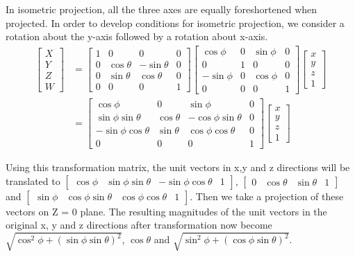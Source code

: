 \documentclass[12pt]{article}
\begin{document}
In isometric projection, all the three axes are equally foreshortened when projected. In order to develop conditions for isometric projection, we consider a rotation about the y-axis followed by a rotation about x-axis.
\begin{align}
    \begin{bmatrix}
    	X \\ Y \\ Z \\ W
    \end{bmatrix} & =  
    \begin{bmatrix}
    	1 & 0 & 0 & 0 \\
    	0 & \cos \theta & -\sin \theta & 0 \\
    	0 & \sin \theta & \cos \theta & 0 \\
    	0 & 0 & 0 & 1  
    \end{bmatrix} 
    \begin{bmatrix}
    	\cos \phi & 0 & \sin \phi & 0 \\
    	0 & 1 & 0 & 0 \\
    	-\sin \phi & 0 & \cos \phi & 0 \\
    	0 & 0 & 0 & 1  
    \end{bmatrix}
    \begin{bmatrix}
    	x \\ y \\ z \\ 1
    \end{bmatrix}\\
    & = 
    \begin{bmatrix}
    	\cos \phi & 0 & \sin \phi & 0 \\
    	\sin \phi \sin \theta & \cos \theta & -\cos \phi \sin \theta & 0 \\
    	-\sin \phi \cos \theta & \sin \theta & \cos \phi \cos \theta & 0 \\
    	0 & 0 & 0 & 1 
    \end{bmatrix}
    \begin{bmatrix}
    	x \\ y \\ z \\ 1
    \end{bmatrix}
\end{align}

Using this transformation matrix, the unit vectors in x,y and z directions will be translated to $\begin{bmatrix}
\cos \phi & \sin \phi \sin \theta & -\sin \phi \cos \theta & 1
\end{bmatrix}
$, 
$\begin{bmatrix}
	0 & \cos \theta & \sin \theta & 1
\end{bmatrix}$ and 
$\begin{bmatrix}
	\sin \phi & \cos \phi \sin \theta & \cos \phi \cos \theta & 1
\end{bmatrix}$. Then we take a projection of these vectors on Z = 0 plane. The resulting magnitudes of the unit vectors in the original x, y and z directions after transformation now become $ \sqrt{\cos^2 \phi + ( \sin \phi \sin \theta )^2} $,  $\cos \theta$ and $\sqrt{\sin^2 \phi + (\cos \phi \sin \theta)^2}$.
\end{document}
